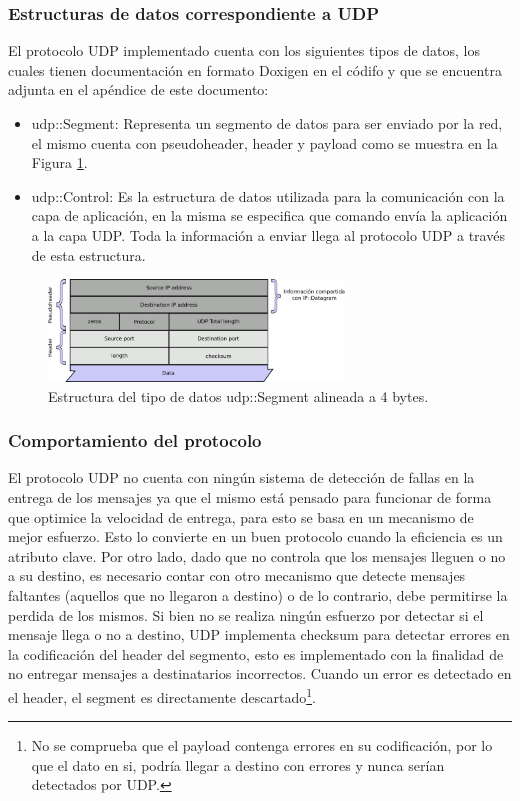 \documentclass[10pt,a4paper]{article}
\begin{document}
\subsubsection{Estructuras de datos correspondiente a UDP}

El protocolo UDP implementado cuenta con los siguientes tipos de datos, los cuales tienen documentación en formato Doxigen en el códifo y que se encuentra adjunta en el apéndice de este documento:

\begin{itemize}
\item udp::Segment: Representa un segmento de datos para ser enviado por la red, el mismo cuenta con pseudoheader, header y payload como se muestra en la Figura \ref{figure: udp segment}.
\item udp::Control: Es la estructura de datos utilizada para la comunicación con la capa de aplicación, en la misma se especifica que comando envía la aplicación a la capa UDP. Toda la información a enviar llega al protocolo UDP a través de esta estructura.
\end{itemize}

\begin{figure}[!htb]
    \centering
    \includegraphics[width = 0.7\textwidth]{img/png/UDP-Segment.png}
    \caption{Estructura del tipo de datos udp::Segment alineada a 4 bytes.}
    \label{figure: udp segment}
\end{figure}

\subsubsection{Comportamiento del protocolo}

El protocolo UDP no cuenta con ningún sistema de detección de fallas en la entrega de los mensajes ya que el mismo está pensado para funcionar de forma que optimice la velocidad de entrega, para esto se basa en un mecanismo de mejor esfuerzo. Esto lo convierte en un buen protocolo cuando la eficiencia es un atributo clave. Por otro lado, dado que no controla que los mensajes lleguen o no a su destino, es necesario contar con otro mecanismo que detecte mensajes faltantes (aquellos que no llegaron a destino) o de lo contrario, debe permitirse la perdida de los mismos. Si bien no se realiza ningún esfuerzo por detectar si el mensaje llega o no a destino, UDP implementa checksum para detectar errores en la codificación del header del segmento, esto es implementado con la finalidad de no entregar mensajes a destinatarios incorrectos. Cuando un error es detectado en el header, el segment es directamente descartado\footnote{No se comprueba que el payload contenga errores en su codificación, por lo que el dato en si, podría llegar a destino con errores y nunca serían detectados por UDP.}.\\
\end{document}
